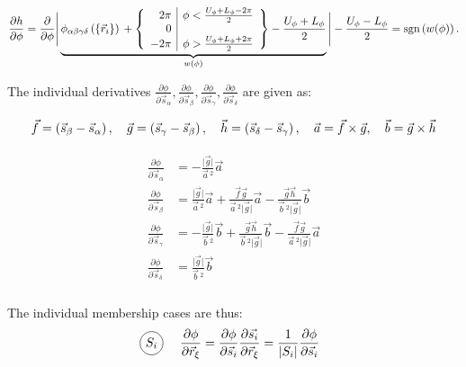 \documentclass[a4paper]{article}
\newcommand*\circled[1]{
  \tikz[baseline=(char.base)]{
    \node[shape=circle,draw,inner sep=2pt] (char) {#1};
  }
}
\begin{document}
\begin{equation}
  \frac{\partial h}{\partial \phi} = \frac{\partial}{\partial \phi}
    \Bigg\lvert
      \underbrace{\phi_{\alpha\beta\gamma\delta}\left(\left\{\vec{r}_i \right\}\right){} + \left\{
        \begin{array}{r | r}
        2\pi & \phi < \frac{U_\phi + L_\phi - 2\pi}{2}\\
        0 & \\
        -2\pi & \phi > \frac{U_\phi + L_\phi + 2\pi}{2}\\
        \end{array}
      \right\}-\frac{U_\phi+ L_\phi}{2}
      }_{w(\phi)}
    \Bigg\rvert - \frac{U_\phi - L_\phi}{2}
  = \textrm{sgn}\left(w(\phi)\right).
\end{equation}

The individual derivatives $\frac{\partial\phi}{\partial\vec{s}_{\alpha}}, 
\frac{\partial\phi}{\partial\vec{s}_{\beta}}, 
\frac{\partial\phi}{\partial\vec{s}_{\gamma}}, 
\frac{\partial\phi}{\partial\vec{s}_{\delta}}$ are given as:

\begin{equation}
  \vec{f} = \left(\vec{s}_{\beta}-\vec{s}_{\alpha}\right),
  \quad\vec{g} = \left(\vec{s}_{\gamma}-\vec{s}_{\beta}\right),
  \quad\vec{h} = \left(\vec{s}_{\delta}-\vec{s}_{\gamma}\right),
  \quad\vec{a} = \vec{f} \times \vec{g},
  \quad\vec{b} = \vec{g} \times \vec{h}
\end{equation}

\begin{align}\begin{aligned}
  \frac{\partial\phi}{\partial\vec{s}_{\alpha}} &= 
    -\frac{\lvert\vec{g}\rvert}{\vec{a}\,^2}\vec{a}\\
  \frac{\partial\phi}{\partial\vec{s}_{\beta}}  &= 
    \frac{\lvert\vec{g}\rvert}{\vec{a}\,^2}\vec{a}
    + \frac{\vec{f}\vec{g}}{\vec{a}\,^2\lvert\vec{g}\rvert}\vec{a}
    - \frac{\vec{g}\vec{h}}{\vec{b}\,^2\lvert\vec{g}\rvert}\vec{b}\\
  \frac{\partial\phi}{\partial\vec{s}_{\gamma}} &= 
    - \frac{\lvert\vec{g}\rvert}{\vec{b}\,^2}\vec{b}
    + \frac{\vec{g}\vec{h}}{\vec{b}\,^2\lvert\vec{g}\rvert}\vec{b}
    - \frac{\vec{f}\vec{g}}{\vec{a}\,^2\lvert\vec{g}\rvert}\vec{a}\\
  \frac{\partial\phi}{\partial\vec{s}_{\delta}} &= 
    \frac{\lvert\vec{g}\rvert}{\vec{b}\,^2}\vec{b}\\
\end{aligned}\end{align}

The individual membership cases are thus:
\begin{align}
  \text{\circled{$S_i$}} &\quad\frac{\partial\phi}{\partial\vec{r}_{\xi}} 
    = \frac{\partial\phi}{\partial\vec{s}_{i}}
      \frac{\partial\vec{s_{i}}}{\partial\vec{r}_{\xi}}
    = \frac{1}{\lvert S_i\rvert}
      \frac{\partial\phi}{\partial\vec{s}_{i}}
\end{align}
\end{document}
